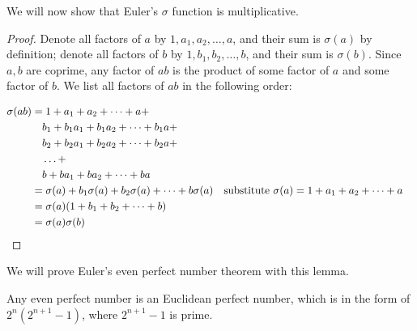 We will now show that Euler's $\sigma$ function is multiplicative.

\begin{proof}
Denote all factors of $a$ by $1, a_1, a_2, \dotsc, a$, and their sum is $\sigma(a)$ by definition; denote all factors of $b$ by $1, b_1, b_2, \dotsc, b$, and their sum is $\sigma(b)$. Since $a, b$ are coprime, any factor of $ab$ is the product of some factor of $a$ and some factor of $b$. We list all factors of $ab$ in the following order:

\begin{align*}
\sigma(ab)
  &= 1 + a_1 + a_2 + \dotsb + a + \\
  &\quad b_1 + b_1a_1 + b_1a_2 + \dotsb + b_1a + \\
  &\quad b_2 + b_2a_1 + b_2a_2 + \dotsb + b_2a + \\
  &\quad \dotso + \\
  &\quad b + ba_1 + ba_2 + \dotsb + ba \\
  &= \sigma(a) + b_1\sigma(a) + b_2\sigma(a) + \dotsb + b\sigma(a) & \text{substitute }\sigma(a) = 1 + a_1 + a_2 + \dotsb + a \\
  &= \sigma(a)(1 + b_1 + b_2 + \dotsb + b) \\
  &= \sigma(a)\sigma(b) && \qedhere
\end{align*}
\end{proof}

We will prove Euler's even perfect number theorem with this lemma. 

\begin{theorem}
Any even perfect number is an Euclidean perfect number, which is in the form of $2^n(2^{n+1}-1)$, where $2^{n+1}-1$ is prime.
\end{theorem}

